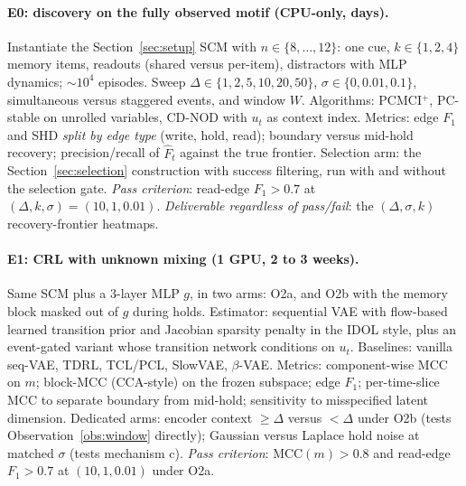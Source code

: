 \documentclass[11pt]{article}
\theoremstyle{plain}
\theoremstyle{definition}
\begin{document}
\paragraph{E0: discovery on the fully observed motif (CPU-only, days).}
Instantiate the Section~\ref{sec:setup} SCM with $n \in \{8,\dots,12\}$: one cue, $k \in \{1,2,4\}$ memory items, readouts (shared versus per-item), distractors with MLP dynamics; $\sim 10^4$ episodes. Sweep $\Delta \in \{1,2,5,10,20,50\}$, $\sigma \in \{0, 0.01, 0.1\}$, simultaneous versus staggered events, and window $W$. Algorithms: PCMCI$^+$, PC-stable on unrolled variables, CD-NOD with $u_t$ as context index. Metrics: edge $F_1$ and SHD \emph{split by edge type} (write, hold, read); boundary versus mid-hold recovery; precision/recall of $\hat F_t$ against the true frontier. Selection arm: the Section~\ref{sec:selection} construction with success filtering, run with and without the selection gate. \emph{Pass criterion}: read-edge $F_1 > 0.7$ at $(\Delta, k, \sigma) = (10, 1, 0.01)$. \emph{Deliverable regardless of pass/fail}: the $(\Delta, \sigma, k)$ recovery-frontier heatmaps.

\paragraph{E1: CRL with unknown mixing (1 GPU, 2 to 3 weeks).}
Same SCM plus a 3-layer MLP $g$, in two arms: O2a, and O2b with the memory block masked out of $g$ during holds. Estimator: sequential VAE with flow-based learned transition prior and Jacobian sparsity penalty in the IDOL style, plus an event-gated variant whose transition network conditions on $u_t$. Baselines: vanilla seq-VAE, TDRL, TCL/PCL, SlowVAE, $\beta$-VAE. Metrics: component-wise MCC on $m$; block-MCC (CCA-style) on the frozen subspace; edge $F_1$; per-time-slice MCC to separate boundary from mid-hold; sensitivity to misspecified latent dimension. Dedicated arms: encoder context $\ge \Delta$ versus $< \Delta$ under O2b (tests Observation~\ref{obs:window} directly); Gaussian versus Laplace hold noise at matched $\sigma$ (tests mechanism c). \emph{Pass criterion}: MCC$(m) > 0.8$ and read-edge $F_1 > 0.7$ at $(10, 1, 0.01)$ under O2a.
\end{document}
